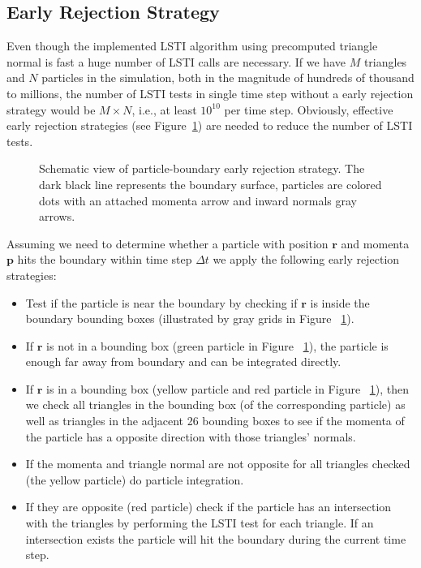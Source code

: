 \documentclass{JAC2003}
\begin{document}
 \subsection{Early Rejection Strategy}
Even though the implemented LSTI algorithm using precomputed triangle normal is
fast a huge number of LSTI calls are necessary. If we have $M$ triangles and $N$
particles in the simulation, both in the magnitude of hundreds of thousand to
millions, the number of LSTI tests in single time step without a early rejection
strategy would be $M \times N$, i.e., at least $10^{10}$ per time step.
Obviously, effective early rejection strategies (see Figure~\ref{fig:P-B}) are
needed to reduce the number of LSTI tests.

\begin{figure}[H]
    \begin{center}
        
    \end{center}
    \caption{Schematic view of particle-boundary early rejection strategy. The dark
    black line represents the boundary surface, particles are colored dots with an
    attached momenta arrow and inward normals gray arrows.\label{fig:P-B}}
\end{figure}

Assuming we need to determine whether a particle with position $\mathbf{r}$
and momenta $\mathbf{p}$ hits the boundary within time step $\Delta{t}$ we apply
the following early rejection strategies:
\begin{itemize}
    \item Test if the particle is near the boundary by checking if $\mathbf{r}$
    is inside the boundary bounding boxes (illustrated by gray grids in
    Figure ~\ref{fig:P-B}). 
    \item If $\mathbf{r}$ is not in a bounding box (green particle in Figure
    ~\ref{fig:P-B}), the particle is enough far away from boundary and
    can be integrated directly.
    \item If $\mathbf{r}$ is in a bounding box (yellow particle and red particle
    in Figure ~\ref{fig:P-B}), then we check all triangles in the bounding box
    (of the corresponding particle) as well as triangles in the adjacent 26
    bounding boxes to see if the momenta of the particle has a opposite
    direction with those triangles' normals.
    \item If the momenta and triangle normal are not opposite for all triangles
    checked (the yellow particle) do particle integration.
    \item If they are opposite (red particle) check if the particle has an
    intersection with the triangles by performing the LSTI test for each
    triangle. If an intersection exists the particle will hit the boundary
    during the current time step.
\end{itemize}
\end{document}
